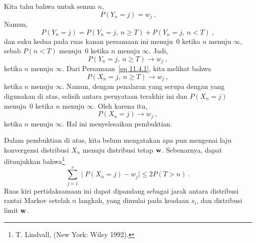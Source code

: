 \begin{theorem}
\begin{equation}
\end{equation}
Kita tahu bahwa untuk semua $n$,
$$P(Y_n = j) = w_j\ .$$
Namun,
$$P(Y_n = j) = P(Y_n = j,\ n \ge T) + P(Y_n = j,\ n < T)\ ,$$
dan suku kedua pada ruas kanan persamaan ini menuju~0 ketika $n$ menuju
$\infty$, sebab $P(n < T)$ menuju~0 ketika $n$ menuju $\infty$. Jadi,
$$P(Y_n = j,\ n \ge T) \rightarrow w_j\ ,$$
ketika $n$ menuju $\infty$. Dari Persamaan~\ref{eq 11.4.1}, kita melihat bahwa
$$P(X_n = j,\ n \ge T) \rightarrow w_j\ ,$$
ketika $n$ menuju $\infty$. Namun, dengan penalaran yang serupa dengan yang
digunakan di atas, selisih
antara pernyataan terakhir ini dan $P(X_n = j)$ menuju~0 ketika $n$ menuju
$\infty$. Oleh karena itu,
$$P(X_n = j) \rightarrow w_j\ ,$$
ketika $n$ menuju $\infty$. Hal ini menyelesaikan pembuktian.
\end{theorem}
Dalam pembuktian di atas, kita belum mengatakan apa pun mengenai laju konvergensi
distribusi $X_n$
menuju distribusi tetap ${\mbox{\bf w}\/}$. Sebenarnya, dapat ditunjukkan
bahwa\footnote{T. Lindvall,    (New York:
Wiley 1992).}
$$
\sum ^{r}_{j = 1} \mid P(X_{n} = j) - w_j \mid \leq 2 
P(T > n)\ .
$$
Ruas kiri pertidaksamaan ini dapat dipandang sebagai jarak antara distribusi
rantai Markov setelah $n$ langkah, yang dimulai pada keadaan $s_i$, dan distribusi
limit ${\mbox{\bf w}\/}$.

